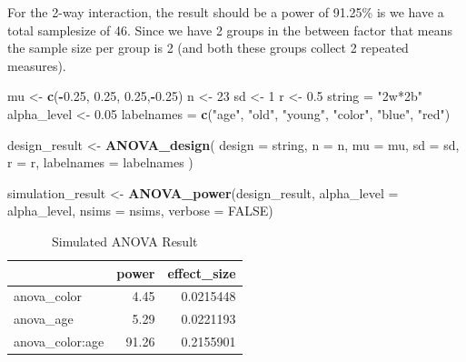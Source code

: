 \documentclass[]{book}
\newenvironment{Shaded}{\begin{snugshade}}{\end{snugshade}}
\newcommand{\DataTypeTok}[1]{\textcolor[rgb]{0.13,0.29,0.53}{#1}}
\newcommand{\DecValTok}[1]{\textcolor[rgb]{0.00,0.00,0.81}{#1}}
\newcommand{\FloatTok}[1]{\textcolor[rgb]{0.00,0.00,0.81}{#1}}
\newcommand{\KeywordTok}[1]{\textcolor[rgb]{0.13,0.29,0.53}{\textbf{#1}}}
\newcommand{\NormalTok}[1]{#1}
\newcommand{\OperatorTok}[1]{\textcolor[rgb]{0.81,0.36,0.00}{\textbf{#1}}}
\newcommand{\OtherTok}[1]{\textcolor[rgb]{0.56,0.35,0.01}{#1}}
\newcommand{\StringTok}[1]{\textcolor[rgb]{0.31,0.60,0.02}{#1}}
\begin{document}
For the 2-way interaction, the result should be a power of 91.25\% is we have a total samplesize of 46. Since we have 2 groups in the between factor that means the sample size per group is 2 (and both these groups collect 2 repeated measures).

\begin{Shaded}
\begin{Highlighting}[]
\NormalTok{mu <-}\StringTok{ }\KeywordTok{c}\NormalTok{(}\OperatorTok{-}\FloatTok{0.25}\NormalTok{, }\FloatTok{0.25}\NormalTok{, }\FloatTok{0.25}\NormalTok{,}\OperatorTok{-}\FloatTok{0.25}\NormalTok{)}
\NormalTok{n <-}\StringTok{ }\DecValTok{23}
\NormalTok{sd <-}\StringTok{ }\DecValTok{1}
\NormalTok{r <-}\StringTok{ }\FloatTok{0.5}
\NormalTok{string =}\StringTok{ "2w*2b"}
\NormalTok{alpha_level <-}\StringTok{ }\FloatTok{0.05}
\NormalTok{labelnames =}\StringTok{ }\KeywordTok{c}\NormalTok{(}\StringTok{"age"}\NormalTok{, }\StringTok{"old"}\NormalTok{, }\StringTok{"young"}\NormalTok{, }\StringTok{"color"}\NormalTok{, }\StringTok{"blue"}\NormalTok{, }\StringTok{"red"}\NormalTok{)}

\NormalTok{design_result <-}\StringTok{ }\KeywordTok{ANOVA_design}\NormalTok{(}
\DataTypeTok{design =}\NormalTok{ string,}
\DataTypeTok{n =}\NormalTok{ n,}
\DataTypeTok{mu =}\NormalTok{ mu,}
\DataTypeTok{sd =}\NormalTok{ sd,}
\DataTypeTok{r =}\NormalTok{ r,}
\DataTypeTok{labelnames =}\NormalTok{ labelnames}
\NormalTok{)}
\end{Highlighting}
\end{Shaded}

\begin{Shaded}
\begin{Highlighting}[]
\NormalTok{simulation_result <-}\StringTok{ }\KeywordTok{ANOVA_power}\NormalTok{(design_result, }
                                 \DataTypeTok{alpha_level =}\NormalTok{ alpha_level, }
                                 \DataTypeTok{nsims =}\NormalTok{ nsims,}
                                 \DataTypeTok{verbose =} \OtherTok{FALSE}\NormalTok{)}
\end{Highlighting}
\end{Shaded}

\begin{table}[!h]

\caption{\label{tab:unnamed-chunk-192}Simulated ANOVA Result}
\centering
\begin{tabular}{l|r|r}
\hline
  & power & effect\_size\\
\hline
anova\_color & 4.45 & 0.0215448\\
\hline
anova\_age & 5.29 & 0.0221193\\
\hline
anova\_color:age & 91.26 & 0.2155901\\
\hline
\end{tabular}
\end{table}
\end{document}
